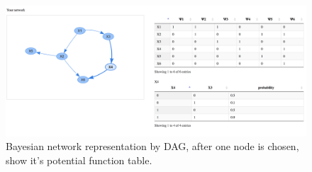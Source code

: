 \documentclass{article}
\begin{document}
    \begin{figure}[h!]
        \includegraphics[width=\linewidth]{img/network_selected_node_table.png}
        \caption{Bayesian network representation by DAG, after one node is chosen, show it's potential function table.}
        \label{fig:besian_network_chosen_node}
    \end{figure}
    \vspace{0.5cm}
\end{document}
